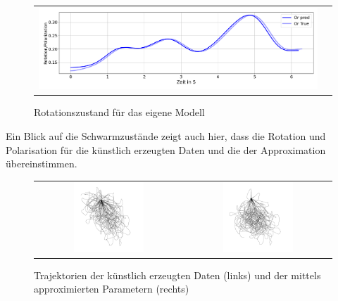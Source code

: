 \begin{figure}[H]
\centering
\begin{tabular}{cc}
\includegraphics[width=1.0\textwidth]{figures/Experimente/10Fisch/PWD_Rot.png} 
\end{tabular}
\caption{Rotationszustand für das eigene Modell \label{fig:PWD_Rot}}
\end{figure}

Ein Blick auf die Schwarmzustände zeigt auch hier, dass die Rotation und Polarisation für die künstlich erzeugten Daten und die der Approximation übereinstimmen.

\begin{figure}[H]
\centering
\begin{tabular}{cc}
\includegraphics[width=0.5\textwidth]{figures/Experimente/10Fisch/pwd_true.png}&
\includegraphics[width=0.5\textwidth]{figures/Experimente/10Fisch/pwd_pred.png}
\end{tabular}
\caption{Trajektorien der künstlich erzeugten Daten (links) und der mittels approximierten Parametern (rechts) \label{fig:APWD}}
\end{figure}

